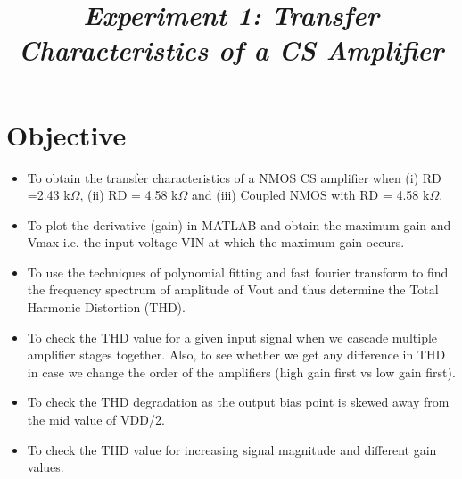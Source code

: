 \documentclass[12pt]{article}
\title{{\it \textbf{Experiment 1:\hspace{0.5cm} Transfer Characteristics of a CS Amplifier}\/} }
\renewcommand{\baselinestretch}{0.5}
\begin{document}
 


\baselineskip14pt


\maketitle 








\renewcommand{\baselinestretch}{0.5} 

\section*{Objective}
\begin{itemize}
\item To obtain the transfer characteristics of a NMOS CS amplifier when (i) RD =2.43 k$\Omega$, (ii) RD = 4.58 k$\Omega$ and (iii) Coupled NMOS with RD = 4.58 k$\Omega$.
\item To plot the derivative (gain) in MATLAB and obtain the maximum gain and Vmax i.e. the input voltage VIN at which the maximum gain occurs.
\item To use the techniques of polynomial fitting and fast fourier transform to find the frequency spectrum of amplitude of Vout and thus determine the Total Harmonic Distortion (THD).
\item To check the THD value for a given input signal when we cascade multiple amplifier stages together. Also, to see whether we get any difference in THD in case we change the order of the amplifiers (high gain first vs low gain first).
\item To check the THD degradation as the output bias point is skewed away from the mid value of VDD/2.
\item To check the THD value for increasing signal magnitude and different gain values.
\end{itemize}
\end{document}

